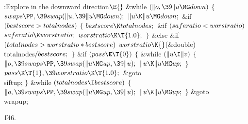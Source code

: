 \B{}:Explore in the downward direction\X${}\E{}$\6
\&{while} ${}(\|o,\39\|u\MG\\{down}){}$\5
${}\{{}$\1\6
${}\\{swaps}\PP,\39\\{swap}(\|u,\39\|u\MG\\{down});{}$\6
${}\|u\K\|u\MG\\{down};{}$\6
\&{if} ${}(\\{bestscore}>\\{totalnodes}){}$\5
${}\{{}$\1\6
${}\\{bestscore}\K\\{totalnodes};{}$\6
\&{if} ${}(\\{saferatio}<\\{worstratio}){}$\1\5
${}\\{saferatio}\K\\{worstratio};{}$\2\6
${}\\{worstratio}\K\T{1.0};{}$\6
\4${}\}{}$\5
\2\&{else} \&{if} ${}(\\{totalnodes}>\\{worstratio}*\\{bestscore}){}$\1\5
${}\\{worstratio}\K{}$(\&{double}) \\{totalnodes}${}/\\{bestscore};{}$\2\6
\4${}\}{}$\2\6
\&{if} ${}(\\{pass}\E\T{0}){}$\5
${}\{{}$\1\6
\&{while} ${}(\|u\I\|v){}$\5
${}\{{}$\1\6
${}\|o,\39\\{swaps}\PP,\39\\{swap}(\|u\MG\\{up},\39\|u);{}$\6
${}\|u\K\|u\MG\\{up};{}$\6
\4${}\}{}$\2\6
${}\\{pass}\K\T{1},\39\\{worstratio}\K\T{1.0};{}$\6
\&{goto} \\{siftup};\6
\4${}\}{}$\2\6
\&{while} ${}(\\{totalnodes}\I\\{bestscore}){}$\5
${}\{{}$\1\6
${}\|o,\39\\{swaps}\PP,\39\\{swap}(\|u\MG\\{up},\39\|u);{}$\6
${}\|u\K\|u\MG\\{up};{}$\6
\4${}\}{}$\2\6
\&{goto} \\{wrapup};\par
\U146.\fi

